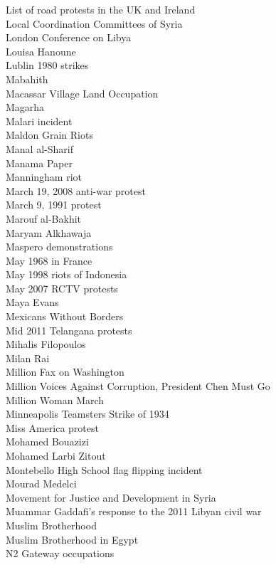 List of road protests in the UK and Ireland\\
Local Coordination Committees of Syria\\
London Conference on Libya\\
Louisa Hanoune\\
Lublin 1980 strikes\\
Mabahith\\
Macassar Village Land Occupation\\
Magarha\\
Malari incident\\
Maldon Grain Riots\\
Manal al-Sharif\\
Manama Paper\\
Manningham riot\\
March 19, 2008 anti-war protest\\
March 9, 1991 protest\\
Marouf al-Bakhit\\
Maryam Alkhawaja\\
Maspero demonstrations\\
May 1968 in France\\
May 1998 riots of Indonesia\\
May 2007 RCTV protests\\
Maya Evans\\
Mexicans Without Borders\\
Mid 2011 Telangana protests\\
Mihalis Filopoulos\\
Milan Rai\\
Million Fax on Washington\\
Million Voices Against Corruption, President Chen Must Go\\
Million Woman March\\
Minneapolis Teamsters Strike of 1934\\
Miss America protest\\
Mohamed Bouazizi\\
Mohamed Larbi Zitout\\
Montebello High School flag flipping incident\\
Mourad Medelci\\
Movement for Justice and Development in Syria\\
Muammar Gaddafi's response to the 2011 Libyan civil war\\
Muslim Brotherhood\\
Muslim Brotherhood in Egypt\\
N2 Gateway occupations\\

